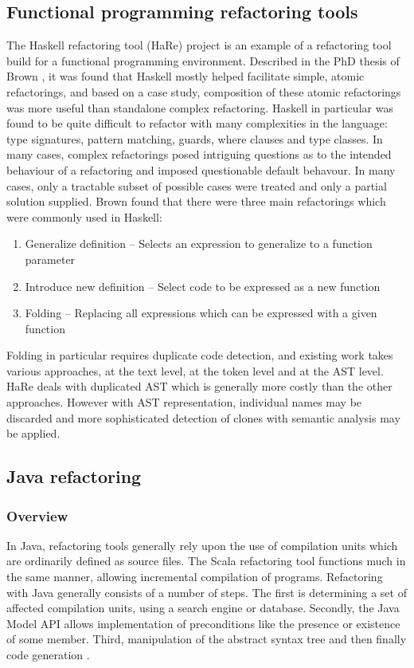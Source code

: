 \subsection{Functional programming refactoring tools}
The Haskell refactoring tool (HaRe) project is an example of a refactoring tool build for a functional programming environment. Described in the PhD thesis of Brown \cite{brown2008tool}, it was found that Haskell mostly helped facilitate simple, atomic refactorings, and based on a case study, composition of these atomic refactorings was more useful than standalone complex refactoring. Haskell in particular was found to be quite difficult to refactor with many complexities in the language: type signatures, pattern matching, guards, where clauses and type classes. In many cases, complex refactorings posed intriguing questions as to the intended behaviour of a refactoring and imposed questionable default behavour. In many cases, only a tractable subset of possible cases were treated and only a partial solution supplied. Brown found that there were three main refactorings which were commonly used in Haskell: 

\begin{enumerate}
\item Generalize definition -- Selects an expression to generalize to a function parameter
\item Introduce new definition -- Select code to be expressed as a new function
\item Folding -- Replacing all expressions which can be expressed with a given function
\end{enumerate}

Folding in particular requires duplicate code detection, and existing work takes various approaches, at the text level, at the token level and at the AST level. HaRe deals with duplicated AST which is generally more costly than the other approaches. However with AST representation, individual names may be discarded and more sophisticated detection of clones with semantic analysis may be applied. 

\subsection{Java refactoring}
\subsubsection{Overview}
In Java, refactoring tools generally rely upon the use of compilation units which are ordinarily defined as source files. The Scala refactoring tool functions much in the same manner, allowing incremental compilation of programs. Refactoring with Java generally consists of a number of steps. The first is determining a set of affected compilation units, using a search engine or database. Secondly, the Java Model API allows implementation of preconditions like the presence or existence of some member. Third, manipulation of the abstract syntax tree and then finally code generation \cite{baumer2001integrating}. 

